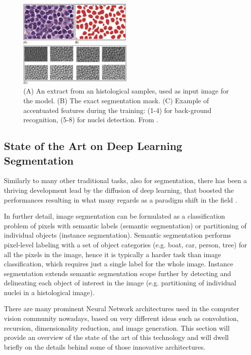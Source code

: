 \begin{figure}
    \centering
    \includegraphics[width = 0.5\textwidth]{images/nuclei_feature}
    \caption{(A) An extract from an histological samples, used as input image for the model. (B) The exact segmentation mask. (C)
    Example of accentuated features during the training: (1-4) for back-ground recognition, (5-8) for nuclei detection. From \cite{alheejawi2020deep}.}
    \label{fig:nuclei_feature}
\end{figure}

\subsection{State of the Art on Deep Learning Segmentation} \label{ssec:soa_seg}
Similarly to many other traditional tasks, also for segmentation, there has been a thriving development lead by the diffusion of deep learning, that boosted the performances resulting in what many regards as a paradigm shift in the field \cite{deep_seg_SOA}.

In further detail, image segmentation can be formulated as a classification problem of pixels with semantic labels (semantic segmentation) or partitioning of individual objects (instance segmentation). Semantic segmentation performs pixel-level labeling with a set of object categories (e.g. boat, car, person, tree) for all the pixels in the image, hence it is typically a harder task than image classification, which requires just a single label for the whole image. Instance segmentation extends semantic segmentation scope further by detecting and delineating each object of interest in the image (e.g. partitioning of individual nuclei in a histological image).

There are many prominent Neural Network architectures used in the computer vision community nowadays, based on very different ideas such as convolution, recursion, dimensionality reduction, and image generation. This section will provide an overview of the state of the art of this technology and will dwell briefly on the details behind some of those innovative architectures.

